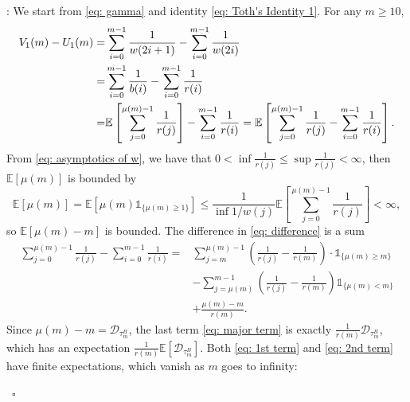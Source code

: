 \documentclass[twoside,12pt,a4paper]{article}
\numberwithin{equation}{section}
\newenvironment{proof}[1][Proof]{{\sc #1}:}{~\hfill $\square$}
\begin{document}
	\begin{proof} 
		We start from \eqref{eq: gamma} and identity \eqref{eq: Toth's Identity 1}. For any $m \geq 10$,
		\begin{align}
			V_1(m) - U_1(m) =& \sum_{i=0}^{m-1} \frac{1}{w(2i+1)} -\sum_{i=0}^{m-1} \frac{1}{w(2i)} 
			\notag \\
			=& \sum_{i=0}^{m-1} \frac{1}{b(i)} -\sum_{i=0}^{m-1} \frac{1}{r(i)} 
			\notag \\
			=& 	\mathbb{E}\left[  \sum_{j=0}^{ \mu(m)-1 } \frac{1}{r(j)}   \right] - \sum_{i=0}^{m-1} \frac{1}{r(i)} = \mathbb{E}\left[  \sum_{j=0}^{ \mu(m)-1 } \frac{1}{r(j)}    - \sum_{i=0}^{m-1} \frac{1}{r(i)}\right]. \label{eq: difference}
		\end{align}
		From \eqref{eq: asymptotics of w}, we have that $0< \inf \frac{1}{r(j)} \leq \sup \frac{1}{r(j)} <\infty $, then $\mathbb{E}\left[\mu(m)\right]$ is bounded by
		$$\mathbb{E}\left[ \mu(m) \right] = \mathbb{E}\left[ \mu(m)\mathbb{1}_{\{\mu(m)\geq 1 \} } \right] \leq  \frac{1}{\inf 1/w(j) }\mathbb{E}\left[  \sum_{j=0}^{ \mu(m)-1 } \frac{1}{r(j)}   \right] <\infty, $$ 
		so $ \mathbb{E}\left[ \mu(m) -m\right]  $ is bounded.
		The difference in \eqref{eq: difference} is a sum
		\begin{align} 
			\sum_{j=0}^{ \mu(m)-1 } \frac{1}{r(j)} - \sum_{i=0}^{m-1} \frac{1}{r(i)} =& \sum_{j=m}^{\mu(m)-1} \left(\frac{1}{r(j)} -\frac{1}{r(m)} \right) \cdot\mathbb{1}_{\{\mu(m)\geq m\}} 
			\label{eq: 1st term}
			\\	
			& - \sum_{j=\mu(m)}^{m-1} \left(\frac{1}{r(j)} -\frac{1}{r(m)} \right) \mathbb{1}_{\{\mu(m)< m\}} 
			\label{eq: 2nd term}
			\\
			& + \frac{\mu(m)-m}{ r(m) }. \label{eq: major term}
		\end{align} 
		Since $\mu(m)-m =  \mathcal{D}_{\tau^B_m}$, the last term \eqref{eq: major term} is exactly $\frac{1}{r(m)} \mathcal{D}_{\tau^B_m}$, which has an expectation $\frac{1}{r(m)} \mathbb{E}\left[\mathcal{D}_{\tau^B_m}\right].$ Both \eqref{eq: 1st term} and \eqref{eq: 2nd term} have finite expectations, which vanish as $m$ goes to infinity:
		

\end{proof}
\end{document}
